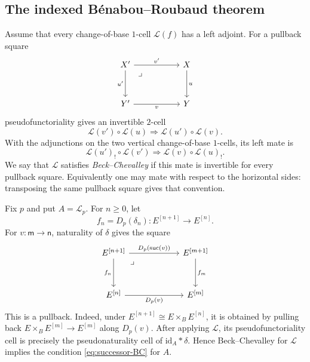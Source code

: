 \documentclass[11pt,a4paper]{article}
\numberwithin{equation}{section}
\theoremstyle{definition}
\theoremstyle{remark}
\newcommand{\id}{\mathrm{id}}
\newcommand{\Lx}{\mathcal L}
\newcommand{\suc}{\operatorname{suc}}
\begin{document}
\subsection{The indexed B\'enabou--Roubaud theorem}

Assume that every change-of-base $1$-cell $\Lx(f)$ has a left
adjoint. For a pullback square
\begin{equation}
\begin{tikzcd}[column sep=5.5em,row sep=3.2em]
  X' \ar[r,"v'"] \ar[d,"u'"']
     \ar[dr,phantom,"\lrcorner"{pos=0.14}]
  & X \ar[d,"u"]
  \\
  Y' \ar[r,"v"'] & Y
\end{tikzcd}
\label{eq:pullback-square}
\end{equation}
pseudofunctoriality gives an invertible $2$-cell
\[
  \Lx(v')\circ\Lx(u)\Longrightarrow\Lx(u')\circ\Lx(v).
\]
With the adjunctions on the two vertical change-of-base $1$-cells,
its left mate is
\begin{equation}
  \Lx(u')_!\circ\Lx(v')\Longrightarrow\Lx(v)\circ\Lx(u)_!.
  \label{eq:indexed-BC-mate}
\end{equation}
We say that $\Lx$ satisfies \emph{Beck--Chevalley} if this mate is
invertible for every pullback square. Equivalently one may mate with
respect to the horizontal sides: transposing the same pullback square
gives that convention.

Fix $p$ and put $A=\Lx_p$. For $n\geq0$, let
\[
  f_n=D_p(\delta_n)\colon E^{[n+1]}\longrightarrow E^{[n]}.
\]
For $v\colon\mathsf m\to\mathsf n$, naturality of $\delta$ gives
the square
\begin{equation}
\begin{tikzcd}[column sep=6.0em,row sep=3.4em]
  E^{[n+1]} \ar[r,"D_p(\suc(v))"] \ar[d,"f_n"']
    \ar[dr,phantom,"\lrcorner"{pos=0.14}]
  & E^{[m+1]} \ar[d,"f_m"]
  \\
  E^{[n]} \ar[r,"D_p(v)"'] & E^{[m]}
\end{tikzcd}
\label{eq:cech-BC-square}
\end{equation}
This is a pullback. Indeed, under
$E^{[n+1]}\cong E\times_BE^{[n]}$, it is obtained by pulling back
$E\times_BE^{[m]}\to E^{[m]}$ along $D_p(v)$. After applying $\Lx$,
its pseudofunctoriality cell is precisely the pseudonaturality cell of
$\id_A\ast\delta$. Hence Beck--Chevalley for $\Lx$ implies the condition
\eqref{eq:successor-BC} for $A$.
\end{document}
